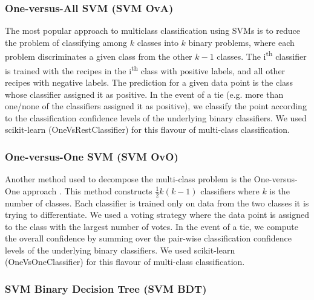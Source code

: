 \documentclass{article}
\def\light#1{{\color{light}#1}}
\begin{document}
\subsubsection*{One-versus-All SVM (SVM OvA)}
The most popular approach to multiclass classification using SVMs is to reduce the problem of classifying among $k$ classes into $k$ binary problems, where each problem discriminates a given class from the other $k-1$ classes. The i\textsuperscript{th} classifier is trained with the recipes in the i\textsuperscript{th} class with positive labels, and all other recipes with negative labels. The prediction for a given data point is the class whose classifier assigned it as positive. In the event of a tie (e.g. more than one/none of the classifiers assigned it as positive), we classify the point according to the classification confidence levels of the underlying binary classifiers.  We used \light{scikit-learn (OneVsRestClassifier)} for this flavour of multi-class classification.

\subsubsection*{One-versus-One SVM (SVM OvO)}
Another method used to decompose the multi-class problem is the One-versus-One approach \cite{OvO}. This method constructs $\tfrac{1}{2}k(k - 1)$ classifiers where $k$ is the number of classes. Each classifier is trained only on data from the two classes it is trying to differentiate. We used a voting strategy where the data point is assigned to the class with the largest number of votes. In the event of a tie, we compute the overall confidence by summing over the pair-wise classification confidence levels of the underlying binary classifiers. We used \light{scikit-learn (OneVsOneClassifier)} for this flavour of multi-class classification.

\subsubsection*{SVM Binary Decision Tree (SVM BDT)}
\end{document}
